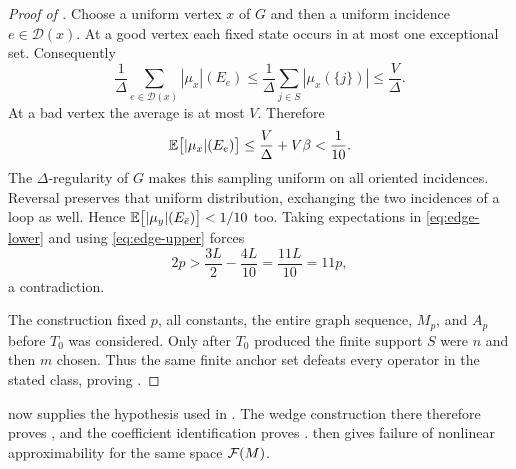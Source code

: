\begin{proof}[Proof of ]
Choose a uniform vertex $x$ of $G$ and then a uniform incidence
$e\in\mathcal D(x)$. At a good vertex each fixed state occurs in
at most one exceptional set. Consequently
\[
 \frac1\Delta\sum_{e\in\mathcal D(x)}|\mu_x|(E_e)
 \le\frac1\Delta\sum_{j\in S}|\mu_x(\{j\})|
 \le\frac V\Delta.
\]
At a bad vertex the average is at most $V$. Therefore
\begin{equation}\label{eq:average-error}
 \mathbb E\bigl[|\mu_x|(E_e)\bigr]\le\frac V\Delta+V\beta<\frac1{10}.
\end{equation}
The $\Delta$-regularity of $G$ makes this sampling uniform on all oriented
incidences.
Reversal preserves that uniform distribution, exchanging the two
incidences of a loop as well. Hence
$\mathbb E\bigl[|\mu_y|(E_{\bar e})\bigr]<1/10$ too. Taking expectations in
\eqref{eq:edge-lower} and using \eqref{eq:edge-upper} forces
\[
 2p>\frac{3L}{2}-\frac{4L}{10}
    =\frac{11L}{10}=11p,
\]
a contradiction.

The construction fixed $p$, all constants, the entire graph sequence,
$M_p$, and $A_p$ before $T_0$ was considered. Only after $T_0$ produced
the finite support $S$ were $n$ and then $m$ chosen. Thus the same finite
anchor set defeats every operator in the stated class, proving
.
\end{proof}

 now supplies the hypothesis used in .
The wedge construction there therefore proves , and the
coefficient identification proves .
 then gives failure of nonlinear approximability for
the same space $\mathcal F(M)$.

